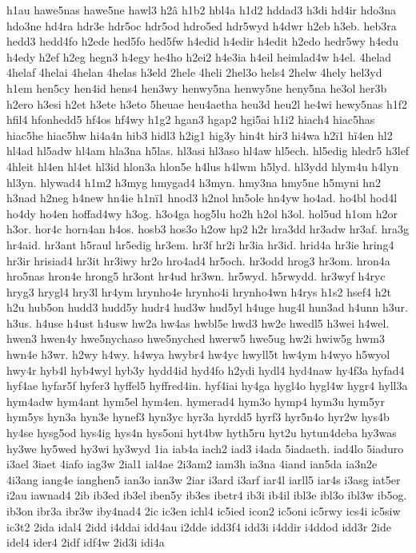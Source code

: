 {h1au
hawe5nas
hawe5ne
hawl3
h2â
h1b2
hbl4a
h1d2
hddad3
h3di
hd4ir
hdo3na
hdo3ne
hd4ra
hdr3e
hdr5oc
hdr5od
hdro5ed
hdr5wyd
h4dwr
h2eb
h3eb.
heb3ra
hedd3
hedd4fo
h2ede
hed5fo
hed5fw
h4edid
h4edir
h4edit
h2edo
hedr5wy
h4edu
h4edy
h2ef
h2eg
hegn3
h4egy
he4ho
h2ei2
h4e3ia
h4eil
heimlad4w
h4el.
4helad
4helaf
4helai
4helan
4helas
h3eld
2hele
4heli
2hel3o
hels4
2helw
4hely
hel3yd
h1em
hen5cy
hen4id
hens4
hen3wy
henwy5na
henwy5ne
heny5na
he3ol
her3b
h2ero
h3esi
h2et
h3ete
h3eto
5heuae
heu4aetha
heu3d
heu2l
he4wi
hewy5nas
h1f2
hfil4
hfonhedd5
hf4os
hf4wy
h1g2
hgan3
hgap2
hgi5ai
h1i2
hiach4
hiac5has
hiac5he
hiac5hw
hi4a4n
hib3
hidl3
h2ig1
hig3y
hin4t
hir3
hi4wa
h2ï1
hï4en
hl2
hl4ad
hl5adw
hl4am
hla3na
h5las.
hl3asi
hl3aso
hl4aw
hl5ech.
hl5edig
hledr5
h3lef
4hleit
hl4en
hl4et
hl3id
hlon3a
hlon5e
h4lus
h4lwm
h5lyd.
hl3ydd
hlym4u
h4lyn
hl3yn.
hlywad4
h1m2
h3myg
hmygad4
h3myn.
hmy3na
hmy5ne
h5myni
hn2
h3nad
h2neg
h4new
hn4ie
h1nï1
hnod3
h2nol
hn5ole
hn4yw
ho4ad.
ho4bl
hod4l
ho4dy
ho4en
hoffad4wy
h3og.
h3o4ga
hog5lu
ho2h
h2ol
h3ol.
hol5ud
h1om
h2or
h3or.
hor4c
horn4an
h4os.
hosb3
hos3o
h2ow
hp2
h2r
hra3dd
hr3adw
hr3af.
hra3g
hr4aid.
hr3ant
h5raul
hr5edig
hr3em.
hr3f
hr2i
hr3ia
hr3id.
hrid4a
hr3ie
hring4
hr3ir
hrisiad4
hr3it
hr3iwy
hr2o
hro4ad4
hr5och.
hr3odd
hrog3
hr3om.
hron4a
hro5nas
hron4e
hrong5
hr3ont
hr4ud
hr3wn.
hr5wyd.
h5rwydd.
hr3wyf
h4ryc
hryg3
hrygl4
hry3l
hr4ym
hrynho4e
hrynho4i
hrynho4wn
h4rys
h1s2
hsef4
h2t
h2u
hub5on
hudd3
hudd5y
hudr4
hud3w
hud5yl
h4uge
hug4l
hun3ad
h4unn
h3ur.
h3us.
h4use
h4ust
h4usw
hw2a
hw4as
hwbl5e
hwd3
hw2e
hwedl5
h3wei
h4wel.
hwen3
hwen4y
hwe5nychaso
hwe5nyched
hwerw5
hwe5ug
hw2i
hwiw5g
hwm3
hwn4e
h3wr.
h2wy
h4wy.
h4wya
hwybr4
hw4yc
hwyll5t
hw4ym
h4wyo
h5wyol
hwy4r
hyb4l
hyb4wyl
hyb3y
hydd4id
hyd4fo
h2ydi
hydl4
hyd4naw
hy4f3a
hyfad4
hyf4ae
hyfar5f
hyfer3
hyffel5
hyffred4in.
hyf4iai
hy4ga
hygl4o
hygl4w
hygr4
hyll3a
hym4adw
hym4ant
hym5el
hym4en.
hymerad4
hym3o
hymp4
hym3u
hym5yr
hym5ys
hyn3a
hyn3e
hynef3
hyn3yc
hyr3a
hyrdd5
hyrf3
hyr5n4o
hyr2w
hys4b
hy4se
hysg5od
hys4ig
hys4n
hys5oni
hyt4bw
hyth5ru
hyt2u
hytun4deba
hy3was
hy3we
hy5wed
hy3wi
hy3wyd
1ia
iab4a
iach2
iad3
i4ada
5iadaeth.
iad4lo
5iaduro
i3ael
3iaet
4iafo
iag3w
2ial1
ial4ae
2i3am2
iam3h
ia3na
4iand
ian5da
ia3n2e
4i3ang
iang4e
ianghen5
ian3o
ian3w
2iar
i3ard
i3arf
iar4l
iarll5
iar4s
i3asg
iat5er
i2au
iawnad4
2ib
ib3ed
ib3el
iben5y
ib3es
ibetr4
ib3i
ib4il
ibl3e
ibl3o
ibl3w
ib5og.
ib3on
ibr3a
ibr3w
iby4nad4
2ic
ic3en
ichl4
ic5ied
icon2
ic5oni
ic5rwy
ics4i
ic5siw
ic3t2
2ida
idal4
2idd
i4ddai
idd4au
i2dde
idd3f4
idd3i
i4ddir
i4ddod
idd3r
2ide
idel4
ider4
2idf
idf4w
2id3i
idi4a
}
